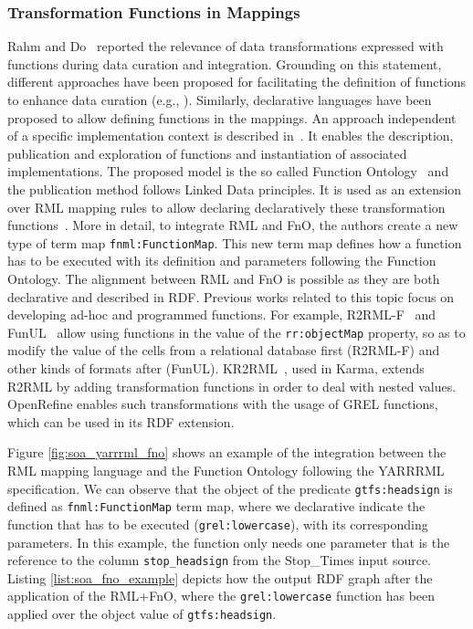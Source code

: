 \subsubsection{Transformation Functions in Mappings}
\label{soa2:functions}
Rahm and Do~\citep{rahm2000data} reported the relevance of data transformations expressed with functions during data curation and integration. Grounding on this statement, different approaches have been proposed for facilitating the definition of functions to enhance data curation (e.g., \citep{galhardas2001declarative,GuptaSKGTM12,raman2001potter}). Similarly, declarative languages have been proposed to allow defining functions in the mappings. An approach independent of a specific implementation context is described in~\citep{demeester2019implementation}. It enables the description, publication and exploration of functions and instantiation of associated implementations. The proposed model is the so called Function Ontology~\citep{de2016ontology} and the publication method follows Linked Data principles. It is used as an extension over RML mapping rules to allow declaring declaratively these transformation functions~\citep{de2017declarative}. More in detail, to integrate RML and FnO, the authors create a new type of term map \texttt{fnml:FunctionMap}. This new term map defines how a function has to be executed with its definition and parameters following the Function Ontology. The alignment between RML and FnO is possible as they are both declarative and described in RDF. Previous works related to this topic focus on developing ad-hoc and programmed functions. For example, R2RML-F~\citep{debruyne2016r2rml} and FunUL~\citep{junior2016funul,junior2016incorporating} allow using functions in the value of the \texttt{rr:objectMap} property, so as to modify the value of the cells from a relational database first (R2RML-F) and other kinds of formats after (FunUL). KR2RML~\citep{slepicka2015kr2rml}, used in Karma, extends R2RML by adding transformation functions in order to deal with nested values. OpenRefine enables such transformations with the usage of GREL functions, which can be used in its RDF extension. 


Figure \ref{fig:soa_yarrrml_fno} shows an example of the integration between the RML mapping language and the Function Ontology following the YARRRML specification. We can observe that the object of the predicate \texttt{gtfs:headsign} is defined as \texttt{fnml:FunctionMap} term map, where we declarative indicate the function that has to be executed (\texttt{grel:lowercase}), with its corresponding parameters. In this example, the function only needs one parameter that is the reference to the column \texttt{stop\_headsign} from the Stop\_Times input source. Listing \ref{list:soa_fno_example} depicts how the output RDF graph after the application of the RML+FnO, where the \texttt{grel:lowercase} function has been applied over the object value of \texttt{gtfs:headsign}.

